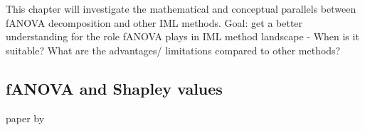 This chapter will investigate the mathematical and conceptual parallels between fANOVA decomposition and other IML methods. Goal: get a better understanding for the role fANOVA plays in IML method landscape - When is it suitable? What are the advantages/ limitations compared to other methods?





\subsection{fANOVA and Shapley values}
paper by \cite{andrewniianang2024}